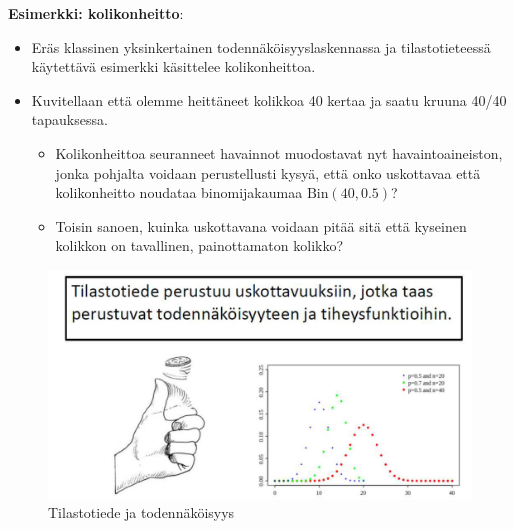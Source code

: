 \documentclass[
]{book}
\providecommand{\tightlist}{%
  \setlength{\itemsep}{0pt}\setlength{\parskip}{0pt}}
\begin{document}
\begin{eblock}{}

\textbf{Esimerkki: kolikonheitto}:

\begin{itemize}
\tightlist
\item
  Eräs klassinen yksinkertainen todennäköisyyslaskennassa ja tilastotieteessä käytettävä esimerkki käsittelee kolikonheittoa.
\item
  Kuvitellaan että olemme heittäneet kolikkoa 40 kertaa ja saatu kruuna 40/40 tapauksessa.

  \begin{itemize}
  \tightlist
  \item
    Kolikonheittoa seuranneet havainnot muodostavat nyt havaintoaineiston, jonka pohjalta voidaan perustellusti kysyä, että onko uskottavaa että kolikonheitto noudataa binomijakaumaa \(\text{Bin}(40, 0.5)\)?
  \item
    Toisin sanoen, kuinka uskottavana voidaan pitää sitä että kyseinen kolikkon on tavallinen, painottamaton kolikko?
  \end{itemize}
\end{itemize}

\end{eblock}

\begin{figure}

{\centering \includegraphics[width=1\linewidth]{images/perustuu} 

}

\caption{Tilastotiede ja todennäköisyys}\label{fig:perus}
\end{figure}

\hfill\break
\hfill\break
\end{document}
